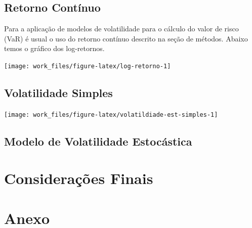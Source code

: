 \documentclass[]{article}
\begin{document}
\subsection{Retorno Contínuo}\label{retorno-continuo-1}

Para a aplicação de modelos de volatilidade para o cálculo do valor de
risco (VaR) é usual o uso do retorno contínuo descrito na seção de
métodos. Abaixo temos o gráfico dos log-retornos.

\begin{center}\texttt{[image: work\_files/figure-latex/log-retorno-1]} \end{center}

\subsection{Volatilidade Simples}\label{volatilidade-simples-1}

\begin{center}\texttt{[image: work\_files/figure-latex/volatildiade-est-simples-1]} \end{center}

\subsection{Modelo de Volatilidade
Estocástica}\label{modelo-de-volatilidade-estocastica}

\section{Considerações Finais}\label{consideracoes-finais}

\section{Anexo}\label{Anexo}


\end{document}
